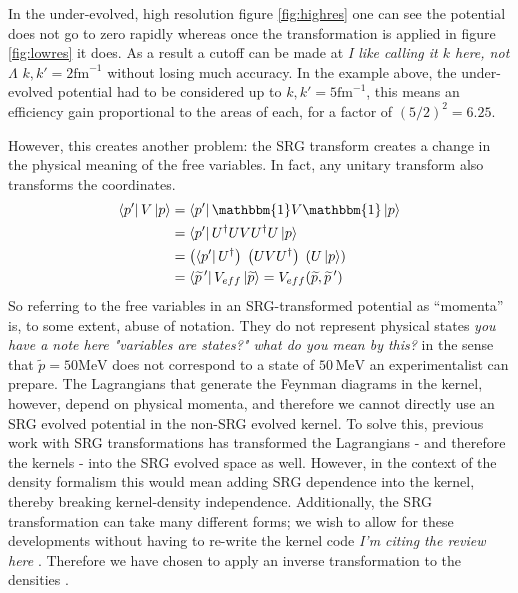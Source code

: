 \documentclass[a4paper,11pt]{article}
\newcommand{\wtil}[1]{\widetilde{#1}}
\newcommand{\br}[1]{\left\langle #1 \right |}
\newcommand{\kt}[1]{\left| #1 \right \rangle}
\newcommand{\ques}[1]{\color{red}\textit{ #1 }\color{black}}
\newcommand{\MeV}{\mathrm{MeV}}
\begin{document}
In the under-evolved, high resolution figure \ref{fig:highres} one can
see the potential does not go to zero rapidly whereas once the
transformation is applied in figure \ref{fig:lowres} it does. As a
result a cutoff can be made at \ques{I like calling it $k$ here, not $\Lambda$} $k,k'=2 \mathrm{fm}^{-1}$ without
losing much accuracy. In the example above, the under-evolved
potential had to be considered up to $k,k'=5\mathrm{fm}^{-1}$, this means an efficiency
gain proportional to the areas of each, for a factor of $(5/2)^2=6.25$.

However, this creates another problem: the SRG transform creates a
change in the physical meaning of the free variables.
In fact, any unitary transform also transforms the coordinates.
\begin{align}
  \br{p'}V\kt{p} &= \br{p'} \mathbbm{1} V \mathbbm{1} \kt{p}\nonumber\\
  &= \br{p'} U^\dag U V U^\dag U \kt{p}\nonumber\\
  &= \left(\br{p'} U^\dag\right)\;\left( U V U^\dag\right)\;\left( U
  \kt{p}\right)\\
  &= \br{\widetilde{p}\,'} V_{eff}
  \kt{\widetilde{p}}=V_{eff}(\widetilde{p},\widetilde{p}\,')\nonumber
\end{align}
So referring to the free variables in an SRG-transformed potential as
``momenta'' is, to some extent, abuse of notation.
They do not represent physical states \ques{you have a note here "variables are states?" what do you mean by this?} in the sense that $\wtil{p}=50 \MeV$
does not correspond to a state of $50 \,\MeV$ an experimentalist can prepare.
The Lagrangians that generate the Feynman diagrams in the kernel, however,
depend on physical momenta, and therefore we cannot directly use an SRG 
evolved potential in the non-SRG evolved kernel.
To solve this, previous work with SRG transformations has transformed the
Lagrangians - and therefore the kernels - into the SRG evolved space as well. However, in
the context of the density formalism this would mean adding SRG
dependence into the kernel, thereby breaking kernel-density independence.
Additionally, the SRG transformation can take many different forms; 
we wish to allow for these developments
without having to re-write the kernel code \cite{Furnstahl2013}\ques{I'm citing the review here}.
Therefore we have chosen to apply an inverse
transformation to the densities \cite{XiangXiang}.
\end{document}
